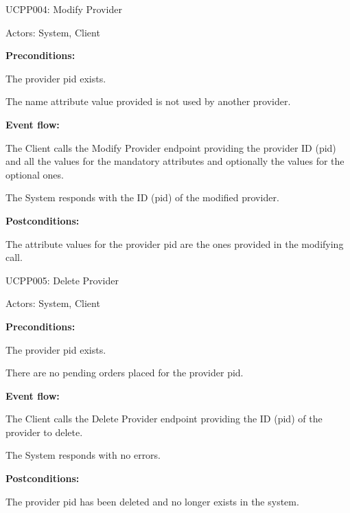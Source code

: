 \begin{ucbox}{UCPP004: Modify Provider}
\label{UCPP004}

Actors: System, Client

\textbf{Preconditions:}

\ucitem The provider pid exists.

\ucitem The name attribute value provided is not used by another provider.

\textbf{Event flow:}

\ucitem The Client calls the Modify Provider endpoint providing the provider ID (pid) and all the values for the mandatory attributes and optionally the values for the optional 
ones.

\ucitem The System responds with the ID (pid) of the modified provider.

\textbf{Postconditions:}

\ucitem The attribute values for the provider pid are the ones provided in the modifying call.

\end{ucbox}

\begin{ucbox}{UCPP005: Delete Provider}
\label{UCPP005}

Actors: System, Client

\textbf{Preconditions:}

\ucitem The provider pid exists.

\ucitem There are no pending orders placed for the provider pid.

\textbf{Event flow:}

\ucitem The Client calls the Delete Provider endpoint providing the ID (pid) of the provider to delete.

\ucitem The System responds with no errors.

\textbf{Postconditions:}

\ucitem The provider pid has been deleted and no longer exists in the system.

\end{ucbox}
\newpage